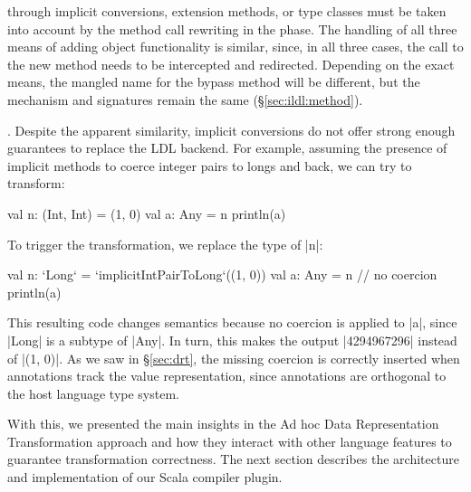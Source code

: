 \noindent
{} through implicit conversions, extension methods, or type classes must be taken into account by the method call rewriting in the \coerce{} phase. The handling of all three means of adding object functionality is similar, since, in all three cases, the call to the new method needs to be intercepted and redirected. Depending on the exact means, the mangled name for the bypass method will be different, but the mechanism and signatures remain the same (\S\ref{sec:ildl:method}).

\noindent
{}. Despite the apparent similarity, implicit conversions do not offer strong enough guarantees to replace the LDL backend. For example, assuming the presence of implicit methods to coerce integer pairs to longs and back, we can try to transform:

\begin{lstlisting-nobreak}
val n: (Int, Int) = (1, 0)
val a: Any = n
println(a)
\end{lstlisting-nobreak}

To trigger the transformation, we replace the type of |n|: %

\begin{lstlisting-nobreak}
val n: `Long` = `implicitIntPairToLong`((1, 0))
val a: Any = n // no coercion
println(a)
\end{lstlisting-nobreak}

This resulting code changes semantics because no coercion is applied to |a|, since |Long| is a subtype of |Any|. In turn, this makes the output |4294967296| instead of |(1, 0)|.
As we saw in \S\ref{sec:drt}, the missing coercion is correctly inserted when annotations track the value representation,
since annotations are orthogonal to the host language type system.

With this, we presented the main insights in the Ad hoc Data Representation Transformation approach and how they interact with other language features to guarantee transformation correctness. The next section describes the architecture and implementation of our Scala compiler plugin.




